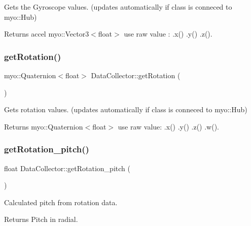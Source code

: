 Gets the Gyroscope values. (updates automatically if class is conneced to myo\+::\+Hub) 

\begin{DoxyReturn}{Returns}
accel myo\+::\+Vector3$<$float$>$ use raw value \+: .x() .y() .z(). 
\end{DoxyReturn}
\mbox{\label{class_data_collector_a46a7e8adb8679fde1021fe89ed0d0be0}} 
\subsubsection{get\+Rotation()}
{\footnotesize\ttfamily myo\+::\+Quaternion$<$float$>$ Data\+Collector\+::get\+Rotation (\begin{DoxyParamCaption}{ }\end{DoxyParamCaption})\hspace{0.3cm}{\ttfamily [inline]}}



Gets rotation values. (updates automatically if class is conneced to myo\+::\+Hub) 

\begin{DoxyReturn}{Returns}
myo\+::\+Quaternion$<$float$>$ use raw value\+: .x() .y() .z() .w(). 
\end{DoxyReturn}
\mbox{\label{class_data_collector_a603dbbfb9d59838c775f51e1e695e638}} 
\subsubsection{get\+Rotation\+\_\+pitch()}
{\footnotesize\ttfamily float Data\+Collector\+::get\+Rotation\+\_\+pitch (\begin{DoxyParamCaption}{ }\end{DoxyParamCaption})\hspace{0.3cm}{\ttfamily [inline]}}



Calculated pitch from rotation data. 

\begin{DoxyReturn}{Returns}
Pitch in radial. 
\end{DoxyReturn}
\mbox{\label{class_data_collector_a4e761ba292f93b5ac18e05a860a697ab}} 
